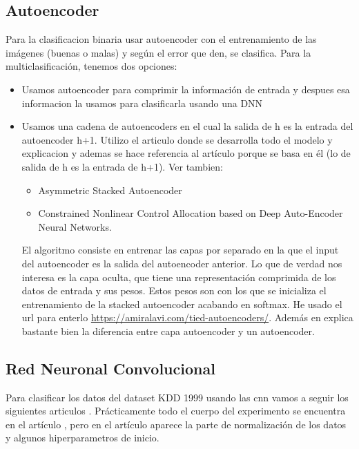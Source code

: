 \documentclass[12pt,a4paper]{book}
\begin{document}
\subsection{Autoencoder}
Para la clasificacion binaria usar autoencoder con el entrenamiento de las imágenes (buenas o malas) y según el error que den, se clasifica.
Para la multiclasificación, tenemos dos opciones:
\begin{itemize}
\item Usamos autoencoder para comprimir la información de entrada y despues esa informacion la usamos para clasificarla usando una DNN \citep{lopes2022effective}
\item Usamos una cadena de autoencoders en el cual la salida de h es la entrada del autoencoder h+1. Utilizo el articulo \citep{farahnakian2018deep} donde se desarrolla todo el modelo y explicacion y ademas se hace referencia al artículo \citep{bengio2006greedy} porque se basa en él (lo de salida de h es la entrada de h+1). Ver tambien:
\begin{itemize}
\item Asymmetric Stacked Autoencoder
\item Constrained Nonlinear Control Allocation based on Deep Auto-Encoder Neural Networks.

\end{itemize} El algoritmo consiste en entrenar las capas por separado en la que el input del autoencoder es la salida del autoencoder anterior. Lo que de verdad nos interesa es la capa oculta, que tiene una representación comprimida de los datos de entrada y sus pesos. Estos pesos son con los que se inicializa el entrenamiento de la stacked autoencoder acabando en softmax. He usado el url para enterlo \url{https://amiralavi.com/tied-autoencoders/}. Además en \citep{bao2017deep} explica bastante bien la diferencia entre capa autoencoder y un autoencoder.
\end{itemize}
\subsection{Red Neuronal Convolucional}
Para clasificar los datos del dataset KDD 1999 usando las \gls{cnn} vamos a seguir los siguientes articulos \citep{kim2020cnn, yang2006anomaly, nguyen2018design, kim2018encoding}. Prácticamente todo el cuerpo del experimento se encuentra en el artículo \citep{kim2020cnn}, pero en el artículo \citep{kim2018encoding} aparece la parte de normalización de los datos y algunos hiperparametros de inicio.
\end{document}
